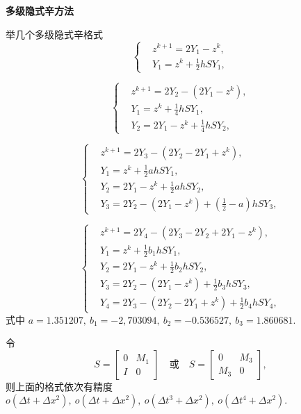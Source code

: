 \noindent \textbf{多级隐式辛方法}

举几个多级隐式辛格式 \cite{qin2011struc}
\begin{equation*}
	\left\lbrace \begin{aligned}
		&z^{k+1}=2Y_1-z^k,\\
		&Y_1=z^k+\frac{1}{2}hSY_1,
	\end{aligned}\right.
\end{equation*}

\begin{equation*}
	\left\lbrace \begin{aligned}
		&z^{k+1}=2Y_2-(2Y_1-z^k),\\
		&Y_1=z^k+\frac{1}{4}hSY_1,\\
		&Y_2=2Y_1-z^k+\frac{1}{4}hSY_2,
	\end{aligned}\right.
\end{equation*}

\begin{equation*}
	\left\lbrace \begin{aligned}
		&z^{k+1}=2Y_3-(2Y_2-2Y_1+z^k),\\
		&Y_1=z^k+\frac{1}{2}ahSY_1,\\
		&Y_2=2Y_1-z^k+\frac{1}{2}ahSY_2,\\
		&Y_3=2Y_2-(2Y_1-z^k)+(\frac{1}{2}-a)hSY_3,
	\end{aligned}\right.
\end{equation*}

\begin{equation*}
	\left\lbrace \begin{aligned}
		&z^{k+1}=2Y_4-(2Y_3-2Y_2+2Y_1-z^k),\\
		&Y_1=z^k+\frac{1}{2}b_1hSY_1,\\
		&Y_2=2Y_1-z^k+\frac{1}{2}b_2hSY_2,\\
		&Y_3=2Y_2-(2Y_1-z^k)+\frac{1}{2}b_3hSY_3,\\
		&Y_4=2Y_3-(2Y_2-2Y_1+z^k)+\frac{1}{2}b_4hSY_4,
	\end{aligned}\right.
\end{equation*}
式中 $a=1.351207,~ b_1=-2,703094,~ b_2=-0.536527,~ b_3=1.860681$.

令
\begin{equation*}
	S=\begin{bmatrix}
		0&M_1\\
		I&0
	\end{bmatrix}\quad \text{或} \quad S=\begin{bmatrix}
		0&M_3\\
		M_3&0
	\end{bmatrix},
\end{equation*}
则上面的格式依次有精度 $o(\Delta t+\Delta x^2),~o(\Delta t+\Delta x^2),~o(\Delta t^3+\Delta x^2),~o(\Delta t^4+\Delta x^2)$.

